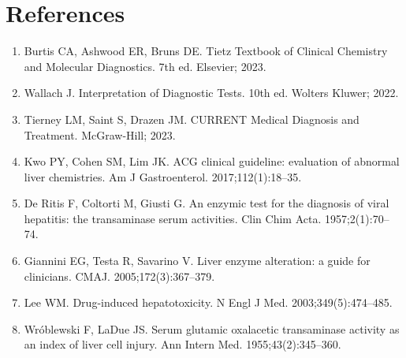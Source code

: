\section*{References}
\begin{enumerate}
  \item Burtis CA, Ashwood ER, Bruns DE. Tietz Textbook of Clinical Chemistry and Molecular Diagnostics. 7th ed. Elsevier; 2023.
  \item Wallach J. Interpretation of Diagnostic Tests. 10th ed. Wolters Kluwer; 2022.
  \item Tierney LM, Saint S, Drazen JM. CURRENT Medical Diagnosis and Treatment. McGraw-Hill; 2023.
  \item Kwo PY, Cohen SM, Lim JK. ACG clinical guideline: evaluation of abnormal liver chemistries. Am J Gastroenterol. 2017;112(1):18--35.
  \item De Ritis F, Coltorti M, Giusti G. An enzymic test for the diagnosis of viral hepatitis: the transaminase serum activities. Clin Chim Acta. 1957;2(1):70--74.
  \item Giannini EG, Testa R, Savarino V. Liver enzyme alteration: a guide for clinicians. CMAJ. 2005;172(3):367--379.
  \item Lee WM. Drug-induced hepatotoxicity. N Engl J Med. 2003;349(5):474--485.
  \item Wr\'{o}blewski F, LaDue JS. Serum glutamic oxalacetic transaminase activity as an index of liver cell injury. Ann Intern Med. 1955;43(2):345--360.
\end{enumerate}

\clearpage
